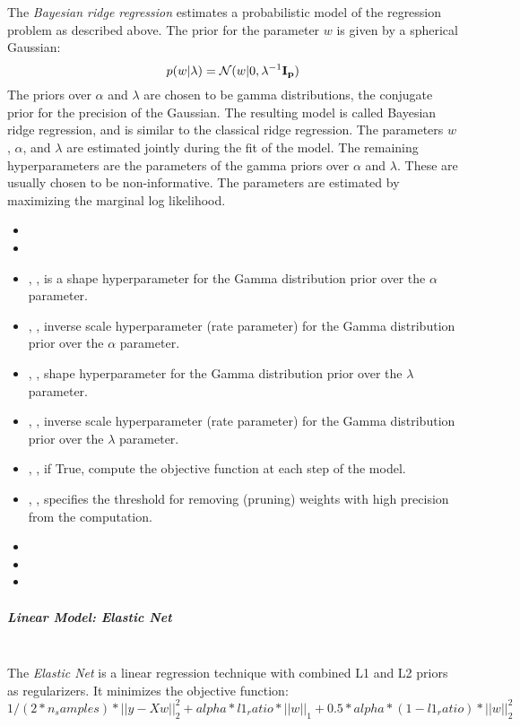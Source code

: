 The \textit{Bayesian ridge regression} estimates a probabilistic model of the
regression problem as described above.
%
The prior for the parameter $w$ is given by a spherical Gaussian:
\begin{equation}
p(w|\lambda) =\mathcal{N}(w|0,\lambda^{-1}\bold{I_{p}})
\end{equation}
The priors over $\alpha$ and $\lambda$ are chosen to be gamma distributions, the
conjugate prior for the precision of the Gaussian.
%
The resulting model is called Bayesian ridge regression, and is similar to the
classical ridge regression.
%
The parameters $w$, $\alpha$, and $\lambda$ are estimated jointly during the fit
of the model.
%
The remaining hyperparameters are the parameters of the gamma priors over
$\alpha$ and $\lambda$.
%
These are usually chosen to be non-informative.
%
The parameters are estimated by maximizing the marginal log likelihood.
%
\begin{itemize}
  \item {}
  \item {}
  \item {}, , is a shape
  hyperparameter for the Gamma distribution prior over the $\alpha$ parameter.
  \item {}, , inverse scale
  hyperparameter (rate parameter) for the Gamma distribution prior over the
  $\alpha$ parameter.
  \item {}, , shape
  hyperparameter for the Gamma distribution prior over the $\lambda$ parameter.
  \item {} , , inverse scale
  hyperparameter (rate parameter) for the Gamma distribution prior over the
  $\lambda$ parameter.
  \item {} , , if True,
  compute the objective function at each step of the model.
  \item {} , , specifies
  the threshold for removing (pruning) weights with high precision from the
  computation.
  \item {}
  \item {}
  \item {}
\end{itemize}
\subparagraph{Linear Model: Elastic Net}
\mbox{}
\\The \textit{Elastic Net} is a linear regression technique with combined L1 and
L2 priors as regularizers.
%
It minimizes the objective function:
\begin{equation}
1/(2*n_samples) *||y - Xw||^2_2+alpha*l1_ratio*||w||_1 + 0.5 *alpha*(1 - l1_ratio)*||w||^2_2
\end{equation}

